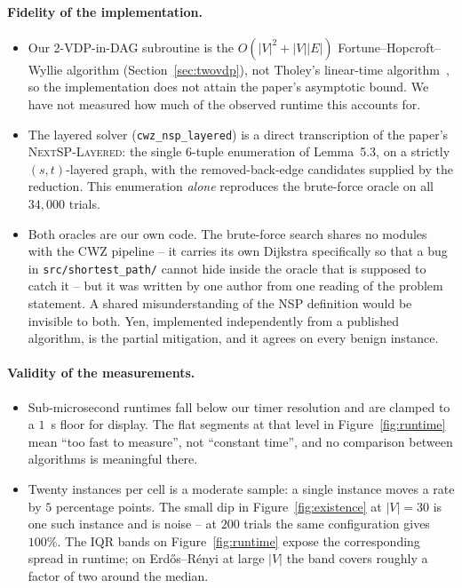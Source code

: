 \paragraph{Fidelity of the implementation.}
\begin{itemize}
  \item Our 2-VDP-in-DAG subroutine is the $O(|V|^{2}+|V||E|)$
    Fortune--Hopcroft--Wyllie algorithm (Section~\ref{sec:twovdp}), not
    Tholey's linear-time algorithm~\cite{Tholey2012}, so the
    implementation does not attain the paper's asymptotic bound. We have
    not measured how much of the observed runtime this accounts for.
  \item The layered solver (\texttt{cwz\_nsp\_layered}) is a direct
    transcription of the paper's \textsc{NextSP-Layered}: the single
    $6$-tuple enumeration of Lemma~5.3, on a strictly $(s,t)$-layered
    graph, with the removed-back-edge candidates supplied by the
    reduction. This enumeration \emph{alone} reproduces the brute-force
    oracle on all $34{,}000$ trials.
  \item Both oracles are our own code. The brute-force search shares no
    modules with the CWZ pipeline -- it carries its own Dijkstra
    specifically so that a bug in \texttt{src/shortest\_path/} cannot
    hide inside the oracle that is supposed to catch it -- but it was
    written by one author from one reading of the problem statement. A
    shared misunderstanding of the NSP definition would be invisible to
    both. Yen, implemented independently from a published algorithm, is
    the partial mitigation, and it agrees on every benign instance.
\end{itemize}

\paragraph{Validity of the measurements.}
\begin{itemize}
  \item Sub-microsecond runtimes fall below our timer resolution and are
    clamped to a $1$~\textmu s floor for display. The flat segments at
    that level in Figure~\ref{fig:runtime} mean ``too fast to measure'',
    not ``constant time'', and no comparison between algorithms is
    meaningful there.
  \item Twenty instances per cell is a moderate sample: a single instance
    moves a rate by $5$ percentage points. The small dip in
    Figure~\ref{fig:existence} at $|V|=30$ is one such instance and is
    noise -- at $200$ trials the same configuration gives $100\%$. The
    IQR bands on Figure~\ref{fig:runtime} expose the corresponding
    spread in runtime; on Erd\H{o}s--R\'enyi at large $|V|$ the band
    covers roughly a factor of two around the median.
\end{itemize}

